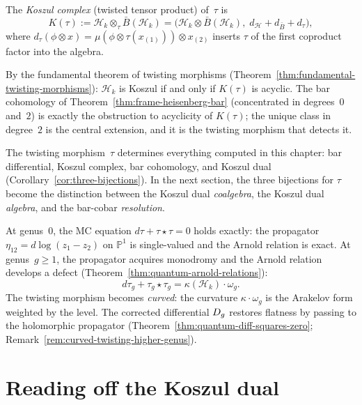 \begin{definition}
\label{def:frame-koszul-complex}
The \emph{Koszul complex} (twisted tensor product) of~$\tau$ is
\begin{equation}\label{eq:frame-koszul-complex}
K(\tau) := \mathcal{H}_k \otimes_\tau \bar{B}(\mathcal{H}_k)
= \bigl(\mathcal{H}_k \otimes \bar{B}(\mathcal{H}_k),\;
  d_{\mathcal{H}} + d_{\bar{B}} + d_\tau\bigr),
\end{equation}
where $d_\tau(\phi \otimes x) = \mu(\phi \otimes \tau(x_{(1)}))
\otimes x_{(2)}$ inserts $\tau$ of the first coproduct factor
into the algebra.
\end{definition}

By the fundamental theorem of twisting morphisms
(Theorem~\ref{thm:fundamental-twisting-morphisms}):
$\mathcal{H}_k$ is Koszul if and only if $K(\tau)$ is acyclic.
The bar cohomology of
Theorem~\ref{thm:frame-heisenberg-bar} (concentrated in
degrees~$0$ and~$2$) is exactly the obstruction to acyclicity
of $K(\tau)$; the unique class in degree~$2$ is the central
extension, and it is the twisting morphism that detects it.

The twisting morphism~$\tau$ determines everything computed in
this chapter: bar differential, Koszul complex, bar cohomology,
and Koszul dual (Corollary~\ref{cor:three-bijections}).
In the next section, the three bijections for $\tau$ become the
distinction between the Koszul dual \emph{coalgebra}, the Koszul
dual \emph{algebra}, and the bar-cobar \emph{resolution}.

\begin{remark}
\label{rem:frame-twisting-higher-genus}
At genus~$0$, the MC equation $d\tau + \tau\star\tau = 0$ holds
exactly: the propagator $\eta_{12} = d\log(z_1 - z_2)$ on
$\mathbb{P}^1$ is single-valued and the Arnold relation is exact.
At genus~$g \geq 1$, the propagator acquires monodromy and the
Arnold relation develops a defect
(Theorem~\ref{thm:quantum-arnold-relations}):
\[
d\tau_g + \tau_g \star \tau_g = \kappa(\mathcal{H}_k) \cdot \omega_g.
\]
The twisting morphism becomes \emph{curved}: the curvature
$\kappa \cdot \omega_g$ is the Arakelov form weighted by the level.
The corrected differential $D_{g}$ restores flatness by passing
to the holomorphic propagator
(Theorem~\ref{thm:quantum-diff-squares-zero};
Remark~\ref{rem:curved-twisting-higher-genus}).
\end{remark}

\section{Reading off the Koszul dual}\label{sec:frame-koszul-dual}

